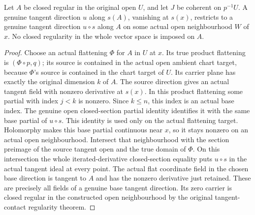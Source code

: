 \begin{lemma}
\label{hir:actual-open-section-tangent-descent}
\leanok
Let $A$ be closed regular in the original open $U$, and let $J$ be coherent on
$p^{-1}U$. A genuine tangent direction $u$ along $s(A)$, vanishing at $s(x)$,
restricts to a genuine tangent direction $u\circ s$ along $A$ on some actual
open neighbourhood $W$ of $x$. No closed regularity in the whole vector space
is imposed on $A$.
\end{lemma}
\begin{proof}
Choose an actual flattening $\Phi$ for $A$ in $U$ at $x$. Its true product
flattening is $(\Phi\circ p,q)$; its source is contained in the actual open
ambient chart target, because $\Phi$'s source is contained in the chart target
of $U$. Its carrier plane has exactly the original dimension $k$ of $A$.
The source direction gives an actual tangent field with nonzero derivative at
$s(x)$. In this product flattening some partial with index $j<k$ is nonzero.
Since $k\le n$, this index is an actual base index. The genuine open
closed-section partial identity identifies it with the same base partial of
$u\circ s$. This identity is used only on the actual flattening target.
Holomorphy makes this base partial continuous near $x$, so it stays nonzero on
an actual open neighbourhood. Intersect that neighbourhood with the section
preimage of the source tangent open and the true domain of $\Phi$.
On this intersection the whole iterated-derivative closed-section equality
puts $u\circ s$ in the actual tangent ideal at every point. The actual flat
coordinate field in the chosen base direction is tangent to $A$ and has the
nonzero derivative just retained. These are precisely all fields of a genuine
base tangent direction. Its zero carrier is closed regular in the constructed
open neighbourhood by the original tangent-contact regularity theorem.
\end{proof}

